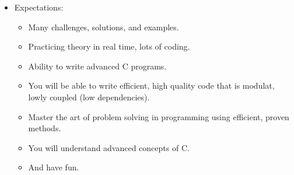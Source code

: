 \begin{itemize}
\begin{itemize}
                \begin{itemize}
                    \item Debugging with the pre-processor, more on gdb.
                    \item Core files, getting the stack trace.
                    \item Static analysis and profiling.
                \end{itemize}
            \item Static libraries and shared objects: overview, creation, dynamic loading.
            \item Working with larger programs: dividing your program into multiple files and compiling multiple files.
            \item Advanced pointers: double pointers (pointers to pointers), function pointers, more on void parameters.
            \item Useful C libraries: the assert library, general utilities library (stdlib.h), (exit, atexit, qsort, memcpy, abort), date and time functions.
            \item Data structures: linked lists, stacks, queues, and trees.
            \item Inter-process communication (IPC) (unix based using cygwin): overview (message queues, shared memory, piping), forking and signals.
            \item Threads (pthread (posix), not \texttt{<threads.h>} (mainly because it's not portable) from C11): overview, creating a thread, mutexes, and semaphores, thread management (multi-threading, join, detach).
            \item Networking (unix based using cygwin): overview (client/server model), creating server and client sockets.
        \end{itemize}
    
    \item Expectations:
        \begin{itemize}
            \item Many challenges, solutions, and examples.
            \item Practicing theory in real time, lots of coding.
            \item Ability to write advanced C programs.
            \item You will be able to write efficient, high quality code that is modulat, lowly coupled (low dependencies).
            \item Master the art of problem solving in programming using efficient, proven methods.
            \item You will understand advanced concepts of C.
            \item And have fun.
        \end{itemize}
\end{itemize}

